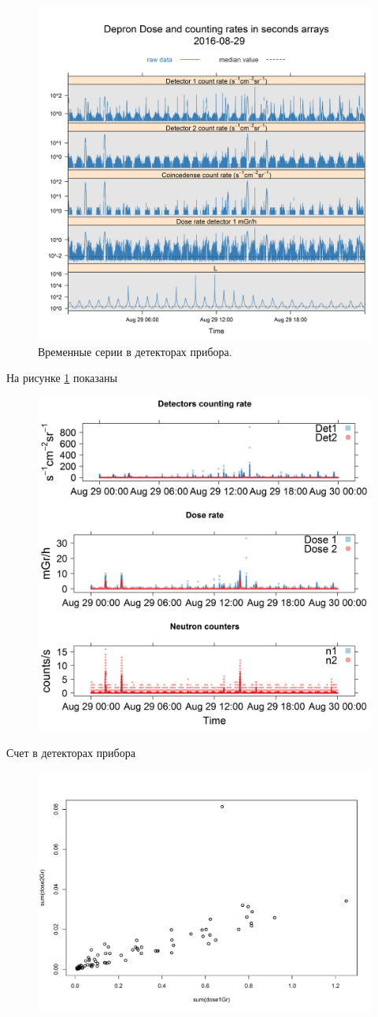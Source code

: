 \begin{figure}
	\centering
	\includegraphics[width=0.7\linewidth]{images/results/depron_sec_log08-29-16}
	\caption{Временные серии в детекторах прибора.}
	\label{fig:depronseclog08-29-16}
\end{figure}
На рисунке \ref{fig:depronseclog08-29-16} показаны 
\begin{figure}
	\centering
	\includegraphics[width=0.7\linewidth]{images/results/depron_sec_log_new08-29-16}
	\caption{}
	\label{fig:depronseclognew08-29-16}
\end{figure}
Счет в детекторах прибора  

\begin{figure}
	\centering
	\includegraphics[width=0.7\linewidth]{images/Flash/Rplot03}
	\caption{}
	\label{fig:rplot03}
\end{figure}

